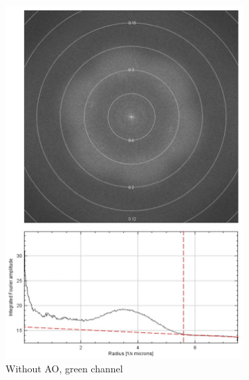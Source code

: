 \begin{figure}
	\vspace{-2.5cm}
	\begin{subfigure}[t]{0.45\textwidth}
		\centering
		\includegraphics[width=\linewidth]{images/DeepSIM_NMJ_woAO_GFP_ft_and_plot.jpg}
		\caption{Without AO, green channel}
		\label{fig:DeepSIM_NMJ_woAO_GFP_ft_and_plot}
	\end{subfigure}
	\begin{subfigure}[t]{0.45\textwidth}
		\centering

\end{subfigure}
\end{figure}
